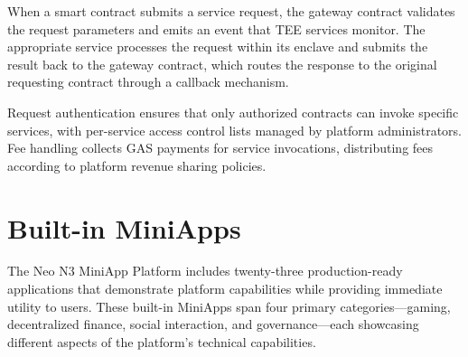 \documentclass[11pt,a4paper]{article}
\begin{document}
When a smart contract submits a service request, the gateway contract validates the request parameters and emits an event that TEE services monitor. The appropriate service processes the request within its enclave and submits the result back to the gateway contract, which routes the response to the original requesting contract through a callback mechanism.

Request authentication ensures that only authorized contracts can invoke specific services, with per-service access control lists managed by platform administrators. Fee handling collects GAS payments for service invocations, distributing fees according to platform revenue sharing policies.

\newpage
\section{Built-in MiniApps}

The Neo N3 MiniApp Platform includes twenty-three production-ready applications that demonstrate platform capabilities while providing immediate utility to users. These built-in MiniApps span four primary categories---gaming, decentralized finance, social interaction, and governance---each showcasing different aspects of the platform's technical capabilities.
\end{document}
